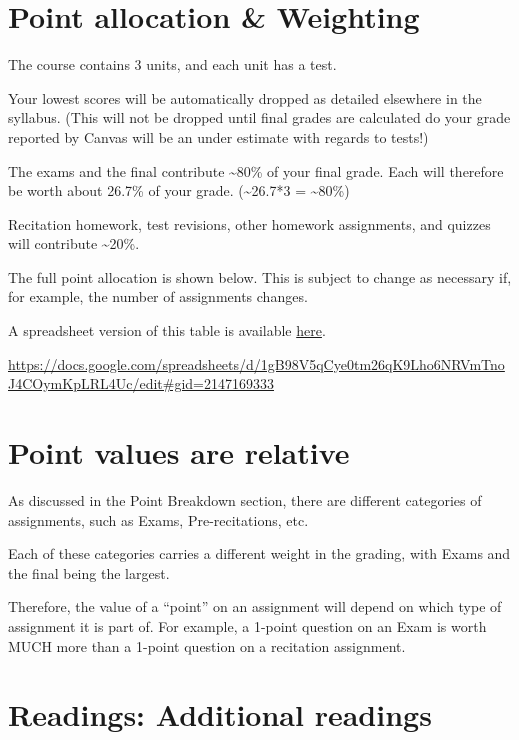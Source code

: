 \documentclass[
]{book}
\begin{document}
\hypertarget{point-allocation-weighting}{%
\chapter{Point allocation \& Weighting}\label{point-allocation-weighting}}

The course contains 3 units, and each unit has a test.

Your lowest scores will be automatically dropped as detailed elsewhere in the syllabus. (This will not be dropped until final grades are calculated do your grade reported by Canvas will be an under estimate with regards to tests!)

The exams and the final contribute \textasciitilde80\% of your final grade. Each will therefore be worth about 26.7\% of your grade. (\textasciitilde26.7*3 = \textasciitilde80\%)

Recitation homework, test revisions, other homework assignments, and quizzes will contribute \textasciitilde20\%.

The full point allocation is shown below. This is subject to change as necessary if, for example, the number of assignments changes.

A spreadsheet version of this table is available \href{https://docs.google.com/spreadsheets/d/1gB98V5qCye0tm26qK9Lho6NRVmTnoJ4COymKpLRL4Uc/edit\#gid=2147169333}{here}.

\url{https://docs.google.com/spreadsheets/d/1gB98V5qCye0tm26qK9Lho6NRVmTnoJ4COymKpLRL4Uc/edit\#gid=2147169333}

\hypertarget{points}{%
\chapter{Point values are relative}\label{points}}

As discussed in the Point Breakdown section, there are different categories of assignments, such as Exams, Pre-recitations, etc.

Each of these categories carries a different weight in the grading, with Exams and the final being the largest.

Therefore, the value of a ``point'' on an assignment will depend on which type of assignment it is part of. For example, a 1-point question on an Exam is worth MUCH more than a 1-point question on a recitation assignment.

\hypertarget{additional-readings}{%
\chapter{Readings: Additional readings}\label{additional-readings}}
\end{document}
